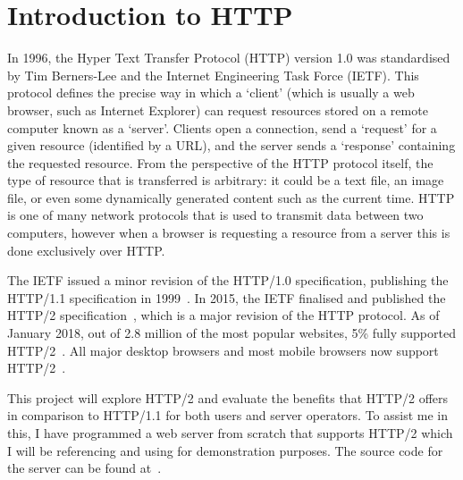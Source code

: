 \section{Introduction to HTTP}

In 1996, the Hyper Text Transfer Protocol (HTTP) version 1.0 was standardised by Tim Berners-Lee and the Internet Engineering Task Force (IETF). This protocol defines the precise way in which a `client' (which is usually a web browser, such as Internet Explorer) can request resources stored on a remote computer known as a `server'. Clients open a connection, send a `request' for a given resource (identified by a URL), and the server sends a `response' containing the requested resource. From the perspective of the HTTP protocol itself, the type of resource that is transferred is arbitrary: it could be a text file, an image file, or even some dynamically generated content such as the current time. HTTP is one of many network protocols that is used to transmit data between two computers, however when a browser is requesting a resource from a server this is done exclusively over HTTP\@. 

The IETF issued a minor revision of the HTTP/1.0 specification, publishing the HTTP/1.1 specification in 1999~\cite{h1}. In 2015, the IETF finalised and published the HTTP/2 specification~\cite{h2}, which is a major revision of the HTTP protocol. As of January 2018, out of 2.8 million of the most popular websites, 5\% fully supported HTTP/2~\cite{isthewebhttp2yet}. All major desktop browsers and most mobile browsers now support HTTP/2~\cite{caniuseh2}.

This project will explore HTTP/2 and evaluate the benefits that HTTP/2 offers in comparison to HTTP/1.1 for both users and server operators. To assist me in this, I have programmed a web server from scratch that supports HTTP/2 which I will be referencing and using for  demonstration purposes. The source code for the server can be found at~\cite{hh}.
